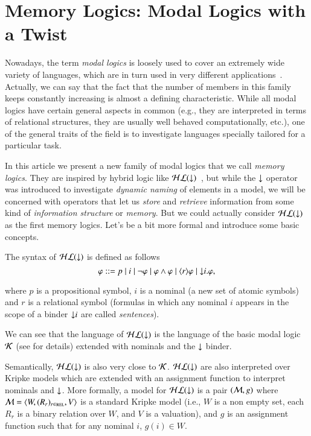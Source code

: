 \section{Memory Logics: Modal Logics with a Twist}\label{twist}

Nowadays, the term \emph{modal logics} is loosely used to cover
an extremely wide variety of languages, which are in turn used
in very different applications~\cite{BRV01,blac:hand06}.  Actually,
we can say that the fact
that the number of members in this family keeps constantly increasing
is almost a defining characteristic.  While all modal logics have
certain general aspects in common (e.g., they are interpreted in
terms of relational structures, they are usually well behaved
computationally, etc.), one of the general traits of the field is
to investigate languages specially tailored for a particular task.

In this article we present a new family of modal logics that
we call \emph{memory logics}. They
are inspired by hybrid logic like $\mathcal{HL}({\downarrow})$~\cite{arec:hybr05b}, but while the
${\downarrow}$ operator was introduced to investigate \emph{dynamic naming}
of elements in a model, we will be concerned with operators that
let us \emph{store} and \emph{retrieve} information from some kind
of \emph{information structure} or \emph{memory}.
But we could actually consider $\mathcal{HL}({\downarrow})$ as the first memory logics.
Let's be a bit more formal and introduce some basic concepts.

The syntax of $\mathcal{HL}({\downarrow})$ is defined as follows
$$
\varphi ::= p \mid i \mid \lnot \varphi \mid \varphi \land
\varphi \mid \langle r \rangle \varphi \mid {\downarrow} i. \varphi,
$$

\noindent
where $p$ is a propositional symbol, $i$ is a nominal (a new set of
atomic symbols) and  $r$ is a relational symbol (formulas in which any nominal $i$
appears in the scope of a binder ${\downarrow} i$ are called \emph{sentences}).

We can see that the language of $\mathcal{HL}({\downarrow})$ is the language of the basic
modal logic $\mathcal{K}$ (see \cite{BRV01} for details) extended with nominals
and the ${\downarrow}$ binder.

Semantically, $\mathcal{HL}({\downarrow})$ is also very close to $\mathcal{K}$.  $\mathcal{HL}({\downarrow})$
are also interpreted over Kripke models which are extended with an
assignment function to interpret nominals and ${\downarrow}$. More formally,
a model for $\mathcal{HL}({\downarrow})$ is a pair $(\mathcal{M},g)$ where $\mathcal{M}=\langle W,(R_r)_{r \in \textsc{rel}},V \rangle$ is a standard Kripke model (i.e., $W$ is a non empty set, each $R_r$ is a binary relation
over $W$, and $V$ is a valuation), and $g$ is an assignment function
such that for any nominal $i$, $g(i) \in W$.

